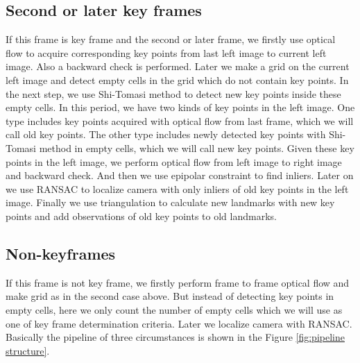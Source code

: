 \documentclass{easychair}
\begin{document}
\subsection{Second or later key frames}
If this frame is key frame and the second or later frame, we firstly use optical flow to acquire corresponding key points from last left image to current left image. Also a backward check is performed. Later we make a grid on the current left image and detect empty cells in the grid which do not contain key points. In the next step, we use Shi-Tomasi method to detect new key points inside these empty cells. In this period, we have two kinds of key points in the left image. One type includes key points acquired with optical flow from last frame, which we will call old key points. The other type includes newly detected key points with Shi-Tomasi method in empty cells, which we will call new key points. Given these key points in the left image, we perform optical flow from left image to right image and backward check. And then we use epipolar constraint to find inliers. Later on we use RANSAC to localize camera with only inliers of old key points in the left image. Finally we use triangulation to calculate new landmarks with new key points and add observations of old key points to old landmarks.

\subsection{Non-keyframes}
If this frame is not key frame, we firstly perform frame to frame optical flow and make grid as in the second case above. But instead of detecting key points in empty cells, here we only count the number of empty cells which we will use as one of key frame determination criteria. Later we localize camera with RANSAC.\\

Basically the pipeline of three circumstances is shown in the Figure \ref{fig:pipeline structure}.
\end{document}
